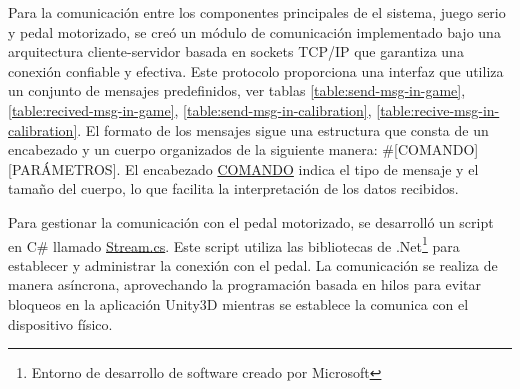Para la comunicación entre los componentes principales de el sistema, juego serio y pedal motorizado, se creó un módulo de comunicación implementado bajo una arquitectura cliente-servidor basada en sockets TCP/IP que garantiza una conexión confiable y efectiva. Este protocolo proporciona una interfaz que utiliza un conjunto de mensajes predefinidos, ver tablas \ref{table:send-msg-in-game}, \ref{table:recived-msg-in-game}, \ref{table:send-msg-in-calibration}, \ref{table:recive-msg-in-calibration}. El formato de los mensajes sigue una estructura que consta de un encabezado y un cuerpo organizados de la siguiente manera: \#[COMANDO][PARÁMETROS]. El encabezado \underline{COMANDO} indica el tipo de mensaje y el tamaño del cuerpo, lo que facilita la interpretación de los datos recibidos.

\vspace{5pt} 
Para gestionar la comunicación con el pedal motorizado, se desarrolló un script en C\# llamado \underline{Stream.cs}. Este script utiliza las bibliotecas de .Net\footnote{Entorno de desarrollo de software creado por Microsoft} para establecer y administrar la conexión con el pedal. La comunicación se realiza de manera asíncrona, aprovechando la programación basada en hilos para evitar bloqueos en la aplicación Unity3D mientras se establece la comunica con el dispositivo físico.

